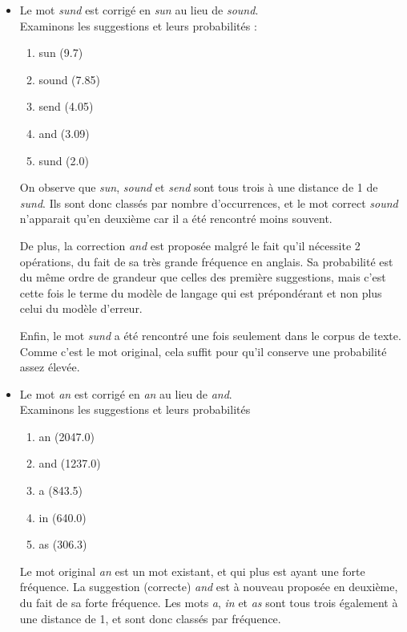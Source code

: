 \documentclass[10pt,a4paper]{article}
\begin{document}
\begin{itemize}
\item Le mot \textit{sund} est corrigé en \textit{sun} au lieu de \textit{sound}.\\
Examinons les suggestions et leurs probabilités : 
\begin{enumerate}
\item sun (9.7)
\item sound (7.85)
\item send (4.05)
\item and (3.09)
\item sund (2.0)
\end{enumerate}
On observe que \textit{sun}, \textit{sound} et \textit{send} sont tous trois à une distance de 1 de \textit{sund}. Ils sont donc classés par nombre d'occurrences, et le mot correct \textit{sound} n'apparait qu'en deuxième car il a été rencontré moins souvent.

De plus, la correction \textit{and} est proposée malgré le fait qu'il nécessite 2 opérations, du fait de sa très grande fréquence en anglais. Sa probabilité est du même ordre de grandeur que celles des première suggestions, mais c'est cette fois le terme du modèle de langage qui est prépondérant et non plus celui du modèle d'erreur.

Enfin, le mot \textit{sund} a été rencontré une fois seulement dans le corpus de texte. Comme c'est le mot original, cela suffit pour qu'il conserve une probabilité assez élevée.\\

\item Le mot \textit{an} est corrigé en \textit{an} au lieu de \textit{and}.\\
Examinons les suggestions et leurs probabilités
\begin{enumerate}
\item an (2047.0)
\item and (1237.0)
\item a (843.5)
\item in (640.0)
\item as (306.3)
\end{enumerate}
Le mot original \textit{an} est un mot existant, et qui plus est ayant une forte fréquence. La suggestion (correcte) \textit{and} est à nouveau proposée en deuxième, du fait de sa forte fréquence. Les mots \textit{a}, \textit{in} et \textit{as} sont tous trois également à une distance de 1, et sont donc classés par fréquence.\\


\end{itemize}
\end{document}
